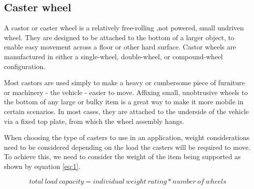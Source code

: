 \subsection{Caster wheel}
A castor or caster wheel is a relatively free-rolling ,not powered, small undriven wheel. They are designed to be attached to the bottom of a larger object, to enable easy movement across a floor or other hard surface. Castor wheels are manufactured in either a single-wheel, double-wheel, or compound-wheel configuration.
\par
Most castors are used simply to make a heavy or cumbersome piece of furniture or machinery - the vehicle - easier to move. Affixing small, unobtrusive wheels to the bottom of any large or bulky item is a great way to make it more mobile in certain scenarios. In most cases, they are attached to the underside of the vehicle via a fixed top plate, from which the wheel assembly hangs.
\par
When choosing the type of casters to use in an application, weight considerations need to be considered depending on the load the casters will be required to move. To achieve this, we need to consider the weight of the item being supported as shown by equation \ref{eq:1}.

\begin{equation} \label{eq:1}
total\:load\:capacity = individual\:weight\:rating * number\:of\:wheels
\end{equation}

